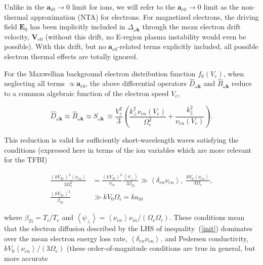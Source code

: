\documentclass[draft]{agujournal2019}
\renewcommand{\vec}{\mathbf}
\begin{document}
Unlike in the $\vec{a}_{i0}\rightarrow 0$ limit for ions, we will refer 
to the $\vec{a}_{e0}\rightarrow0$ limit as the non-thermal approximation (NTA) for electrons. 
For magnetized electrons, the driving field $\vec{E}_{0}$
has been implicitly included in $\Delta_{\omega\vec{k}}$ through the
mean electron drift velocity, $\vec{V}_{e0}$ (without this drift, no E-region plasma instability would even be possible). 
With this drift, but no  $\vec{a}_{e0}$-related terms explicitly included,  
all possible electron thermal effects are totally ignored.

For the Maxwellian background electron distribution function $f_{0}(V_{e})$, when neglecting all terms
$\propto\vec{a}_{e0}$, the above differential operators $\hat{D}_{\omega
\vec{k}}$ and $\hat{B}_{\omega\vec{k}}$ reduce to a common algebraic function
of the electron speed $V_{e}$,
\begin{linenomath*}
\begin{equation}
\hat{D}_{\omega\vec{k}}\approx\hat{B}_{\omega\vec{k}}\approx S_{\omega\vec{k}%
}\,\equiv\frac{V_{e}^{2}}{3}\left(  \frac{k_{\perp}^{2}\nu_{en}(V_{e})}%
{\Omega_{e}^{2}}+\frac{k_{\|}^{2}}{\nu_{en}(V_{e})}\right)  .
\label{DBS}
\end{equation}
\end{linenomath*}
This reduction is valid for sufficiently short-wavelength waves satisfying the
conditions (expressed here in terms of the ion variables which are more relevant for the TFBI)
\begin{linenomath*}
\begin{align}
\frac{\left(  kV_{Te}\right)  ^{2}\left\langle \nu_{en}\right\rangle
}{3\Omega_{e}^{2}}  &  =\frac{\left(  kV_{Ti}\right)  ^{2}}{\nu_{in}}%
\frac{\left\langle \psi_{\perp}\right\rangle }{3\beta_{Ti}}\gg\left\langle
\delta_{en}\nu_{en}\right\rangle ,\;\frac{kV_{0}\left\langle \nu
_{en}\right\rangle }{3\Omega_{e}},\label{init}\\
\frac{\left(  kV_{Ti}\right)  ^{2}}{\beta_{Ti}}  &  \gg kV_{0}\Omega
_{i}=ka_{i0}\nonumber
\end{align}
\end{linenomath*}
where $\beta_{Ti}=T_{i}/T_{e}$ and $\left\langle \psi_{\perp}\right\rangle
=\left\langle \nu_{en}\right\rangle \nu_{in}/(\Omega_{e}\Omega_{i})$.
These conditions mean that the electron diffusion described by the LHS of
inequality~(\ref{init}) dominates over the mean electron energy loss rate,
$\left\langle \delta_{en}\nu_{en}\right\rangle $, and Pedersen conductivity,
$kV_{0}\left\langle \nu_{en}\right\rangle /(3\Omega_{e})$ (these order-of-magnitude conditions are true in general, but more accurate
\end{document}
